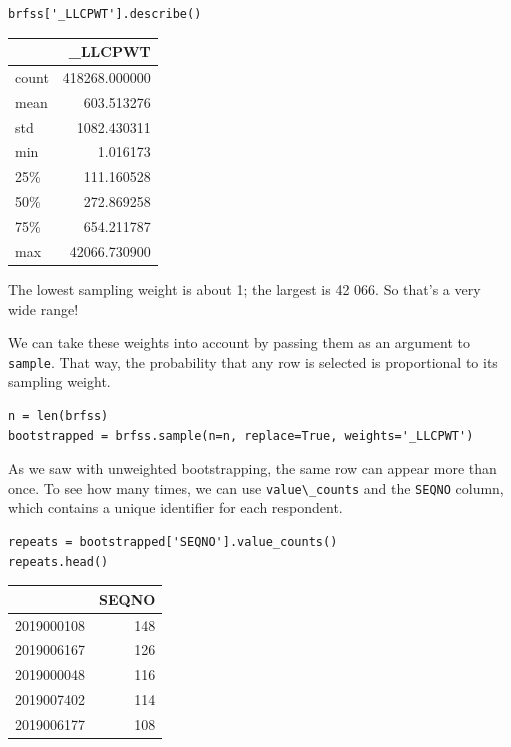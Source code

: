 \begin{lstlisting}[]
brfss['_LLCPWT'].describe()
\end{lstlisting}

\begin{tabular}{lr}
\midrule
{} &        \_LLCPWT \\
\midrule
count &  418268.000000 \\
mean  &     603.513276 \\
std   &    1082.430311 \\
min   &       1.016173 \\
25\%   &     111.160528 \\
50\%   &     272.869258 \\
75\%   &     654.211787 \\
max   &   42066.730900 \\
\midrule
\end{tabular}

The lowest sampling weight is about 1; the largest is 42 066. So that's
a very wide range!

We can take these weights into account by passing them as an argument to
\passthrough{\lstinline!sample!}. That way, the probability that any row
is selected is proportional to its sampling weight.

\begin{lstlisting}[]
n = len(brfss)
bootstrapped = brfss.sample(n=n, replace=True, weights='_LLCPWT')
\end{lstlisting}

As we saw with unweighted bootstrapping, the same row can appear more
than once. To see how many times, we can use
\passthrough{\lstinline!value\_counts!} and the
\passthrough{\lstinline!SEQNO!} column, which contains a unique
identifier for each respondent.

\begin{lstlisting}[]
repeats = bootstrapped['SEQNO'].value_counts()
repeats.head()
\end{lstlisting}

\begin{tabular}{lr}
\midrule
{} &  SEQNO \\
\midrule
2019000108 &    148 \\
2019006167 &    126 \\
2019000048 &    116 \\
2019007402 &    114 \\
2019006177 &    108 \\
\midrule
\end{tabular}

